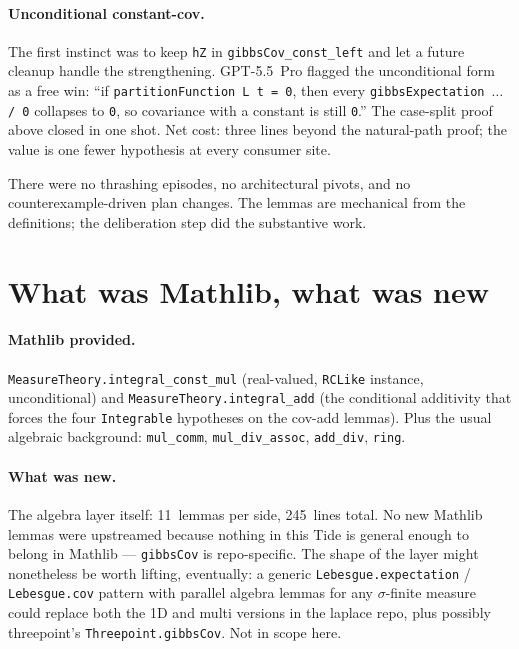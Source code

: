 \documentclass[11pt]{article}
\begin{document}
\paragraph{Unconditional constant-cov.} The first instinct was to
keep \texttt{hZ} in \texttt{gibbsCov\_const\_left} and let a future
cleanup handle the strengthening. GPT-5.5~Pro flagged the unconditional
form as a free win: ``if \texttt{partitionFunction L t = 0}, then
every \texttt{gibbsExpectation $\ldots$ / 0} collapses to \texttt{0},
so covariance with a constant is still \texttt{0}.'' The
case-split proof above closed in one shot. Net cost: three lines
beyond the natural-path proof; the value is one fewer hypothesis at
every consumer site.

There were no thrashing episodes, no architectural pivots, and no
counterexample-driven plan changes. The lemmas are mechanical from
the definitions; the deliberation step did the substantive work.

\section{What was Mathlib, what was new}

\paragraph{Mathlib provided.}
\texttt{MeasureTheory.integral\_const\_mul} (real-valued, \texttt{RCLike}
instance, unconditional) and
\texttt{MeasureTheory.integral\_add} (the conditional additivity that
forces the four \texttt{Integrable} hypotheses on the cov-add lemmas).
Plus the usual algebraic background: \texttt{mul\_comm},
\texttt{mul\_div\_assoc}, \texttt{add\_div}, \texttt{ring}.

\paragraph{What was new.} The algebra layer itself: 11~lemmas per
side, 245~lines total. No new Mathlib lemmas were upstreamed because
nothing in this Tide is general enough to belong in Mathlib —
\texttt{gibbsCov} is repo-specific. The shape of the layer might
nonetheless be worth lifting, eventually: a generic
\texttt{Lebesgue.expectation} / \texttt{Lebesgue.cov} pattern with
parallel algebra lemmas for any $\sigma$-finite measure could replace
both the 1D and multi versions in the laplace repo, plus possibly
threepoint's \texttt{Threepoint.gibbsCov}. Not in scope here.
\end{document}
